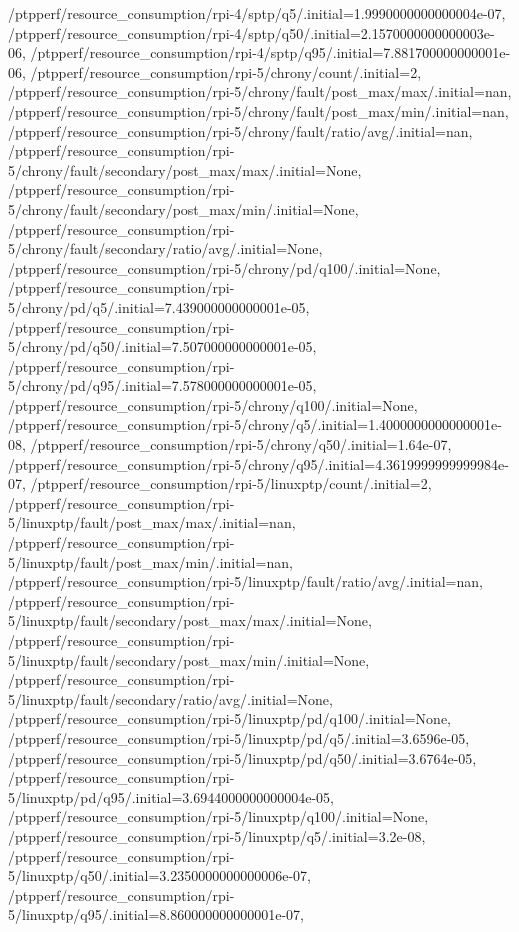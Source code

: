 {    /ptpperf/resource_consumption/rpi-4/sptp/q5/.initial=1.9990000000000004e-07,
    /ptpperf/resource_consumption/rpi-4/sptp/q50/.initial=2.1570000000000003e-06,
    /ptpperf/resource_consumption/rpi-4/sptp/q95/.initial=7.881700000000001e-06,
    /ptpperf/resource_consumption/rpi-5/chrony/count/.initial=2,
    /ptpperf/resource_consumption/rpi-5/chrony/fault/post_max/max/.initial=nan,
    /ptpperf/resource_consumption/rpi-5/chrony/fault/post_max/min/.initial=nan,
    /ptpperf/resource_consumption/rpi-5/chrony/fault/ratio/avg/.initial=nan,
    /ptpperf/resource_consumption/rpi-5/chrony/fault/secondary/post_max/max/.initial=None,
    /ptpperf/resource_consumption/rpi-5/chrony/fault/secondary/post_max/min/.initial=None,
    /ptpperf/resource_consumption/rpi-5/chrony/fault/secondary/ratio/avg/.initial=None,
    /ptpperf/resource_consumption/rpi-5/chrony/pd/q100/.initial=None,
    /ptpperf/resource_consumption/rpi-5/chrony/pd/q5/.initial=7.439000000000001e-05,
    /ptpperf/resource_consumption/rpi-5/chrony/pd/q50/.initial=7.507000000000001e-05,
    /ptpperf/resource_consumption/rpi-5/chrony/pd/q95/.initial=7.578000000000001e-05,
    /ptpperf/resource_consumption/rpi-5/chrony/q100/.initial=None,
    /ptpperf/resource_consumption/rpi-5/chrony/q5/.initial=1.4000000000000001e-08,
    /ptpperf/resource_consumption/rpi-5/chrony/q50/.initial=1.64e-07,
    /ptpperf/resource_consumption/rpi-5/chrony/q95/.initial=4.3619999999999984e-07,
    /ptpperf/resource_consumption/rpi-5/linuxptp/count/.initial=2,
    /ptpperf/resource_consumption/rpi-5/linuxptp/fault/post_max/max/.initial=nan,
    /ptpperf/resource_consumption/rpi-5/linuxptp/fault/post_max/min/.initial=nan,
    /ptpperf/resource_consumption/rpi-5/linuxptp/fault/ratio/avg/.initial=nan,
    /ptpperf/resource_consumption/rpi-5/linuxptp/fault/secondary/post_max/max/.initial=None,
    /ptpperf/resource_consumption/rpi-5/linuxptp/fault/secondary/post_max/min/.initial=None,
    /ptpperf/resource_consumption/rpi-5/linuxptp/fault/secondary/ratio/avg/.initial=None,
    /ptpperf/resource_consumption/rpi-5/linuxptp/pd/q100/.initial=None,
    /ptpperf/resource_consumption/rpi-5/linuxptp/pd/q5/.initial=3.6596e-05,
    /ptpperf/resource_consumption/rpi-5/linuxptp/pd/q50/.initial=3.6764e-05,
    /ptpperf/resource_consumption/rpi-5/linuxptp/pd/q95/.initial=3.6944000000000004e-05,
    /ptpperf/resource_consumption/rpi-5/linuxptp/q100/.initial=None,
    /ptpperf/resource_consumption/rpi-5/linuxptp/q5/.initial=3.2e-08,
    /ptpperf/resource_consumption/rpi-5/linuxptp/q50/.initial=3.2350000000000006e-07,
    /ptpperf/resource_consumption/rpi-5/linuxptp/q95/.initial=8.860000000000001e-07,
}
